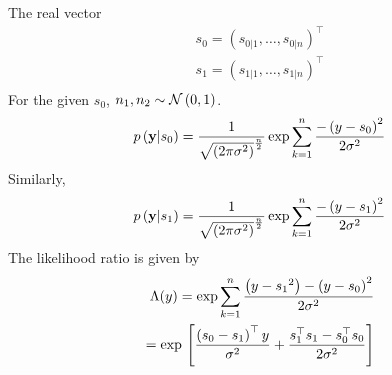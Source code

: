 \begin{enumerate}



\solution
The real vector  \begin{align}
s_0 =(s_{0|1},\dots,s_{0|n})^\top \\
s_1 =(s_{1|1},\dots,s_{1|n})^\top \\
\end{align}
For the given $s_0$, $n_1,n_2 \sim \mathcal{N}\left(0,1\right)$.
\begin{align}
p\left(\mathbf{y}|s_0\right)=\frac{1}{\sqrt{\left(2\pi\sigma^2\right)}^\frac{n}{2}}\exp\sum_{k=1}^{n}\frac{-\left(y - s_0\right)^2}{2\sigma^2}
\end{align}
Similarly, 
\begin{align}
p\left(\mathbf{y}|s_1\right)=\frac{1}{\sqrt{\left(2\pi\sigma^2\right)}^\frac{n}{2}}\exp\sum_{k=1}^{n}\frac{-\left(y - s_1\right)^2}{2\sigma^2}
\end{align}
The likelihood ratio is given by 
\begin{align}
\Lambda(y) = \exp\sum_{k=1}^{n}\frac{\left({y - s_1}^2\right)-\left(y-s_0\right)^2}{2\sigma^2} \\
= \exp{}\left[\frac{\left( s_0 -s_1\right)^\top y}{\sigma^2}+\frac{s_1^\top s_1 - s_0^\top s_0}{2\sigma^2}\right]
\label{eq:llr}
\end{align}


\end{enumerate}
